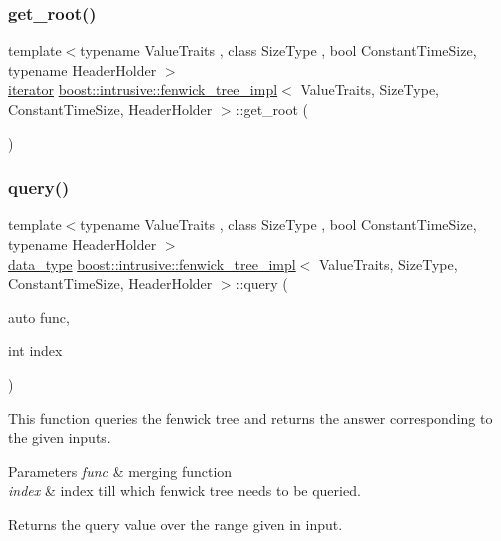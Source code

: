 \subsubsection{\texorpdfstring{get\+\_\+root()}{get\_root()}}
{\footnotesize\ttfamily template$<$typename Value\+Traits , class Size\+Type , bool Constant\+Time\+Size, typename Header\+Holder $>$ \\
\hyperlink{classboost_1_1intrusive_1_1fenwick__tree__impl_a6293502e34de9b16ae198ec557c82132}{iterator} \hyperlink{classboost_1_1intrusive_1_1fenwick__tree__impl}{boost\+::intrusive\+::fenwick\+\_\+tree\+\_\+impl}$<$ Value\+Traits, Size\+Type, Constant\+Time\+Size, Header\+Holder $>$\+::get\+\_\+root (\begin{DoxyParamCaption}{ }\end{DoxyParamCaption})\hspace{0.3cm}{\ttfamily [inline]}}

\mbox{\label{classboost_1_1intrusive_1_1fenwick__tree__impl_ab264157cf44f71965593bef1444d97ec}} 
\subsubsection{\texorpdfstring{query()}{query()}}
{\footnotesize\ttfamily template$<$typename Value\+Traits , class Size\+Type , bool Constant\+Time\+Size, typename Header\+Holder $>$ \\
\hyperlink{classboost_1_1intrusive_1_1fenwick__tree__impl_acc226a36fd0f4814574917193e0c59ef}{data\+\_\+type} \hyperlink{classboost_1_1intrusive_1_1fenwick__tree__impl}{boost\+::intrusive\+::fenwick\+\_\+tree\+\_\+impl}$<$ Value\+Traits, Size\+Type, Constant\+Time\+Size, Header\+Holder $>$\+::query (\begin{DoxyParamCaption}\item[{auto}]{func,  }\item[{int}]{index }\end{DoxyParamCaption})\hspace{0.3cm}{\ttfamily [inline]}}

This function queries the fenwick tree and returns the answer corresponding to the given inputs. 
\begin{DoxyParams}{Parameters}
{\em func} & merging function \\
\hline
{\em index} & index till which fenwick tree needs to be queried. \\
\hline
\end{DoxyParams}
\begin{DoxyReturn}{Returns}
the query value over the range given in input.
\end{DoxyReturn}


